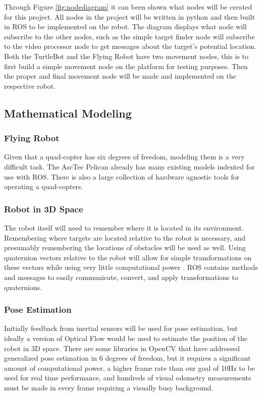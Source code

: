 \documentclass{article}
\begin{document}
	Through Figure \ref{fig:nodediagram} it can been shown what nodes will be created for this project. All nodes in the project will be written in python and then built in ROS to be implemented on the robot. The diagram displays what node will subscribe to the other nodes, such as the simple target finder node will subscribe to the video processor node to get messages about the target's potential location. Both the TurtleBot and the Flying Robot have two movement nodes, this is to first build a simple movement node on the platform for testing purposes. Then the proper and final movement node will be made and implemented on the respective robot. 
	
	\subsection{Mathematical Modeling}
	
		\subsubsection{Flying Robot}
	
		Given that a quad-copter has six degrees of freedom, modeling them is a very difficult task. The AscTec Pelican already has many existing models indented for use with ROS. There is also a large collection of hardware agnostic tools for operating a quad-copters.
	
		\subsubsection{Robot in 3D Space}
		
		The robot itself will need to remember where it is located in its environment. Remembering where targets are located relative to the robot is necessary, and presumably remembering the locations of obstacles will be used as well. Using quaternion vectors relative to the robot will allow for simple transformations on these vectors while using very little computational power \cite{williams2010combining}. ROS contains methods and messages to easily communicate, convert, and apply transformations to quaternions.
	
		\subsubsection{Pose Estimation}
	
		Initially feedback from inertial sensors will be used for pose estimation, but ideally a version of Optical Flow would be used to estimate the position of the robot in 3D space. There are some libraries in OpenCV that have addressed generalized pose estimation in 6 degrees of freedom, but it requires a significant amount of computational power, a higher frame rate than our goal of 10Hz to be used for real time performance, and hundreds of visual odometry measurements must be made in every frame requiring a visually busy background.
\end{document}
